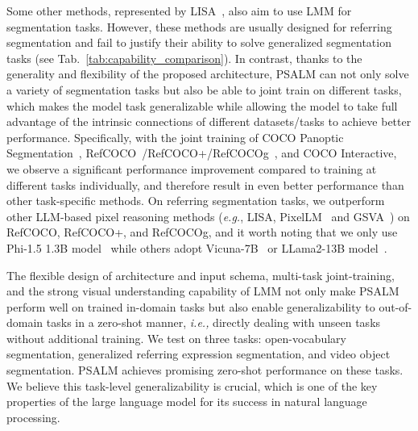 Some other methods, represented by LISA~\cite{lisa}, also aim to use LMM for segmentation tasks. However, these methods are usually designed for referring segmentation and fail to justify their ability to solve generalized segmentation tasks (see Tab.~\ref{tab:capability_comparison}).
In contrast, thanks to the generality and flexibility of the proposed architecture, PSALM can not only solve a variety of segmentation tasks but also be able to joint train on different tasks, which makes the model task generalizable while allowing the model to take full advantage of the intrinsic connections of different datasets/tasks to achieve better performance. 
Specifically, with the joint training of COCO Panoptic Segmentation~\cite{coco}, RefCOCO~\cite{refcoco}/RefCOCO+/RefCOCOg~\cite{refcocog}, and COCO Interactive, we observe a significant performance improvement compared to training at different tasks individually, and therefore result in even better performance than other task-specific methods. On referring segmentation tasks, we outperform other LLM-based pixel reasoning methods (\textit{e.g.}, LISA, PixelLM~\cite{pixellm} and GSVA~\cite{xia2023gsva}) on RefCOCO, RefCOCO+, and RefCOCOg, and it worth noting that we only use Phi-1.5 1.3B model~\cite{phi15} while others adopt Vicuna-7B~\cite{vicuna} or LLama2-13B model~\cite{llama2}.

The flexible design of architecture and input schema, multi-task joint-training, and the strong visual understanding capability of LMM not only make PSALM perform well on trained in-domain tasks but also enable generalizability to out-of-domain tasks in a zero-shot manner, \textit{i.e.,} directly dealing with unseen tasks without additional training. We test on three tasks: open-vocabulary segmentation, generalized referring expression segmentation, and video object segmentation. PSALM achieves promising zero-shot performance on these tasks. We believe this task-level generalizability is crucial, which is one of the key properties of the large language model for its success in natural language processing.

